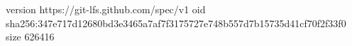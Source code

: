 version https://git-lfs.github.com/spec/v1
oid sha256:347e717d12680bd3e3465a7af7f3175727e748b557d7b15735d41cf70f2f33f0
size 626416
